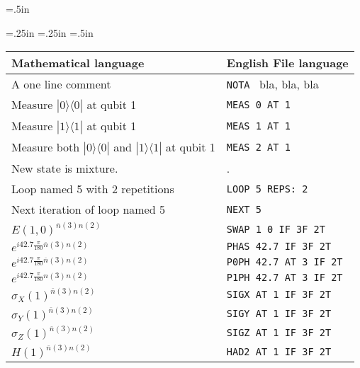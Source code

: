 \documentclass[10pt]{article}
\begin{document}

\renewcommand{\arraystretch}{1.5}

\paperheight=11in
\topmargin=0in
\headheight=0in
\headsep=0in
\topskip=0in
\textheight=8.5in
\footskip=.5in

\paperwidth=8.5in
\oddsidemargin=.25in
\evensidemargin=.25in
\textwidth=6.0in
\parindent=.5in

\newcommand{\sigx}[0]{{ \sigma_X} }
\newcommand{\sigy}[0]{{ \sigma_Y} }
\newcommand{\sigz}[0]{{ \sigma_Z} }
\newcommand{\nbar}[0]{{ \overline{n} } }

\newcommand{\bra}[1]{\langle#1|}
\newcommand{\ket}[1]{|#1\rangle}

\begin{center}
\begin{tabular}{|l|l|}
\hline
Mathematical language & English File language\\
\hline
\hline
A one line comment &
{\tt  NOTA } bla, bla, bla\\
\hline
Measure $\ket{0}\bra{0}$ at qubit 1  &
{\tt  MEAS 0 AT 1 }\\
\hline
Measure $\ket{1}\bra{1}$ at qubit 1  &
{\tt  MEAS 1 AT 1 }\\
\hline
Measure both $\ket{0}\bra{0}$ 
and $\ket{1}\bra{1}$ at qubit 1  &
{\tt  MEAS 2 AT 1 }\\
New state is mixture. &.\\
\hline
Loop named 5 with 2 repetitions &
{\tt  LOOP 5 REPS: 2}\\
\hline
Next iteration of loop named 5&
{\tt  NEXT 5}\\
\hline
$E(1,0)^{\nbar(3)n(2)}$ &
{\tt SWAP  1  0  IF  3F  2T}\\
\hline
$e^{i 42.7 \frac{\pi}{180} \nbar(3)n(2)}$ &
{\tt  PHAS 42.7 IF  3F  2T}\\
\hline
$e^{i 42.7 \frac{\pi}{180} \nbar(3)n(2)}$ &
{\tt  P0PH 42.7 AT  3 IF 2T}\\
\hline
$e^{i 42.7 \frac{\pi}{180} n(3)n(2)}$ &
{\tt  P1PH 42.7 AT  3 IF 2T}\\
\hline
$\sigx(1)^{\nbar(3)n(2)}$ &
{\tt  SIGX  AT  1  IF  3F  2T}\\
\hline
$\sigy(1)^{\nbar(3)n(2)}$ &
{\tt  SIGY  AT  1  IF  3F  2T}\\
\hline
$\sigz(1)^{\nbar(3)n(2)}$ &
{\tt  SIGZ  AT  1  IF  3F  2T}\\
\hline
$H(1)^{\nbar(3)n(2)}$ &
{\tt  HAD2  AT  1  IF  3F  2T}\\

\end{tabular}
\end{center}
\end{document}
